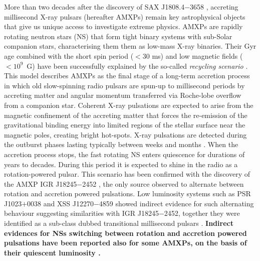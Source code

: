 \documentclass[fleqn,usenatbib]{mnras}
\begin{document}
More than two decades after the discovery of SAX J1808.4$-$3658 \citep{Wijnands:1998vk}, accreting millisecond X-ray pulsars (hereafter AMXPs) remain key astrophysical objects that give us unique access to investigate extreme physics. AMXPs are rapidly rotating neutron stars (NS) that form tight binary systems with sub-Solar companion stars, characterising them them as low-mass X-ray binaries. Their Gyr age combined with the short spin period ($<30$ ms) and low magnetic fields ($<10^9$~G) have been successfully explained by the so-called \textit{recycling scenario} \citep[see e.g.,][]{Alpar:1982wh,Bhattacharya91}. This model describes AMXPs as the final stage of a long-term accretion process in which old slow-spinning radio pulsars are spun-up to millisecond periods by accreting matter and angular momentum transferred via Roche-lobe overflow from a companion star. Coherent X-ray pulsations are expected to arise from the magnetic confinement of the accreting matter that forces the re-emission of the gravitational binding energy into limited regions of the stellar surface near the magnetic poles, creating bright hot-spots.  
X-ray pulsations are detected during the outburst phases lasting typically between weeks and months \citep[see e.g.,][for reviews]{Di-Salvo:2020va,Patruno:2021vs}.
When the accretion process stops, the fast rotating NS enters quiescence for durations of years to decades. During this period it is expected to shine in the radio as a rotation-powered pulsar. This scenario has been confirmed with the discovery of the AMXP IGR J18245$-$2452 \citep{Papitto:2013uf}, the only source observed to alternate between rotation and accretion powered pulsations. Low luminosity systems such as PSR J1023$+$0038 \citep[see e.g.,][]{Stappers:2014wn,Archibald:2015vw} and XSS J12270$-$4859 \citep[see e.g.,][]{Bassa:2014uu,Papitto:2015wo} showed indirect evidence for such alternating behaviour suggesting similarities with IGR J18245$-$2452, together they were identified as a sub-class dubbed transitional millisecond pulsars \citep[see][for a review]{Papitto:2020wl}. \textbf{Indirect evidences for NSs switching between rotation and accretion powered pulsations have been reported also for some AMXPs, on the basis of their quiescent luminosity \citep[see e.g.,][]{Burderi:2003wk,Campana:2004vf,DAvanzo:2009vs}.
}
\end{document}
